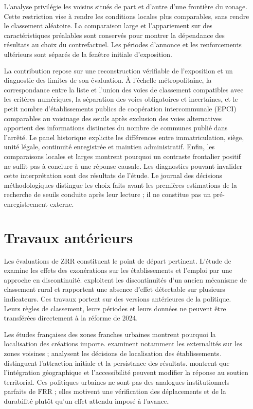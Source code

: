 L’analyse privilégie les voisins situés de part et d’autre d’une frontière du zonage. Cette restriction vise à rendre les conditions locales plus comparables, sans rendre le classement aléatoire. La comparaison large et l’appariement sur des caractéristiques préalables sont conservés pour montrer la dépendance des résultats au choix du contrefactuel. Les périodes d’annonce et les renforcements ultérieurs sont séparés de la fenêtre initiale d’exposition.

La contribution repose sur une reconstruction vérifiable de l’exposition et un diagnostic des limites de son évaluation. À l’échelle métropolitaine, la correspondance entre la liste et l’union des voies de classement compatibles avec les critères numériques, la séparation des voies obligatoires et incertaines, et le petit nombre d’établissements publics de coopération intercommunale (EPCI) comparables au voisinage des seuils après exclusion des voies alternatives apportent des informations distinctes du nombre de communes publié dans l’arrêté. Le panel historique explicite les différences entre immatriculation, siège, unité légale, continuité enregistrée et maintien administratif. Enfin, les comparaisons locales et larges montrent pourquoi un contraste frontalier positif ne suffit pas à conclure à une réponse causale. Les diagnostics pouvant invalider cette interprétation sont des résultats de l’étude. Le journal des décisions méthodologiques distingue les choix faits avant les premières estimations de la recherche de seuils conduite après leur lecture ; il ne constitue pas un pré-enregistrement externe.

\section{Travaux antérieurs}
Les évaluations de ZRR constituent le point de départ pertinent. L’étude de \citet{ref0} examine les effets des exonérations sur les établissements et l’emploi par une approche en discontinuité. \citet{ref1} exploitent les discontinuités d’un ancien mécanisme de classement rural et rapportent une absence d’effet détectable sur plusieurs indicateurs. Ces travaux portent sur des versions antérieures de la politique. Leurs règles de classement, leurs périodes et leurs données ne peuvent être transférées directement à la réforme de 2024.

Les études françaises des zones franches urbaines montrent pourquoi la localisation des créations importe. \citet{ref2} examinent notamment les externalités sur les zones voisines ; \citet{ref4} analysent les décisions de localisation des établissements. \citet{ref3} distinguent l’attraction initiale et la persistance des résultats. \citet{ref5} montrent que l’intégration géographique et l’accessibilité peuvent modifier la réponse au soutien territorial. Ces politiques urbaines ne sont pas des analogues institutionnels parfaits de FRR ; elles motivent une vérification des déplacements et de la durabilité plutôt qu’un effet attendu imposé à l’avance.


